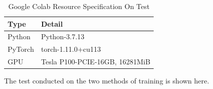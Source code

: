 \begin{table}
  \centering
  \caption{Google Colab Resource Specification On Test}
  \label{tb:spekgoogleclab}
  \begin{tabular}{|l|l|} 
  \hline
  Type    & Detail                      \\ 
  \hline
  Python  & Python-3.7.13                   \\
  PyTorch & torch-1.11.0+cu113              \\
  GPU     & Tesla P100-PCIE-16GB, 16281MiB  \\
  \hline
  \end{tabular}
\end{table}

\par The test conducted on the two methods of training is shown here.

